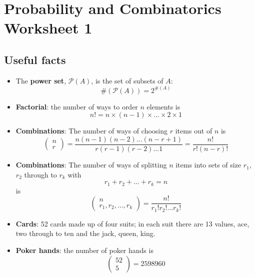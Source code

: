 \documentclass[11pt,a4paper]{scrartcl}
\begin{document}
\section*{Probability and Combinatorics Worksheet 1}

\subsection*{Useful facts}

\begin{itemize}

\item The \textbf{power set}, $\mathcal{P}(A)$, is the set of subsets of $A$:
  \begin{equation}
    \#(\mathcal{P}(A))=2^{\#(A)}
  \end{equation}

\item\textbf{Factorial}: the number of ways to order $n$ elements is
  \begin{equation}
    n!=n\times(n-1)\times\ldots\times2\times1
  \end{equation}
  
\item \textbf{Combinations}: The number of ways of choosing $r$ items out of $n$ is 
\begin{equation}
\left(\begin{array}{c}n\\r\end{array}\right)=\frac{n(n-1)(n-2)\ldots(n-r+1)}{r(r-1)(r-2)\ldots 1}=\frac{n!}{r!(n-r)!} 
\end{equation}


\item \textbf{Combinations}: The number of ways of splitting $n$ items into sets of size $r_1$, $r_2$ through to $r_k$ with
  \begin{equation}
    r_1+r_2+\ldots+r_k=n
  \end{equation}
  is
\begin{equation}
\left(\begin{array}{c}n\\r_1,r_2,\ldots,r_k\end{array}\right)=\frac{n!}{r_1!r_2!\ldots r_k!} 
\end{equation}
 
\item \textbf{Cards}: 52 cards made up of four suits; in each suit
  there are 13 values, ace, two through to ten and the jack, queen,
  king.

\item \textbf{Poker hands}: the number of poker hands is 
\begin{equation}
\left(\begin{array}{c}52\\5\end{array}\right)= 2598960
\end{equation}

\end{itemize}
\end{document}

